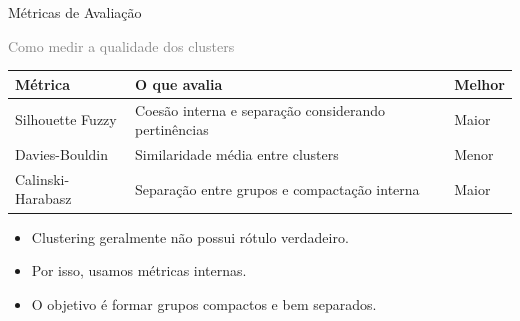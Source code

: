 \documentclass[aspectratio=43]{beamer}
\begin{document}
\begin{frame}[t]{Métricas de Avaliação}

\textcolor{gray}{\large Como medir a qualidade dos clusters}

\vspace{0.25cm}

\scriptsize
\renewcommand{\arraystretch}{1.22}
\begin{center}
\begin{tabular}{P{2.5cm} P{4.1cm} P{2.0cm}}
\toprule
\textbf{Métrica} & \textbf{O que avalia} & \textbf{Melhor} \\
\midrule
Silhouette Fuzzy & Coesão interna e separação considerando pertinências & Maior \\
Davies-Bouldin & Similaridade média entre clusters & Menor \\
Calinski-Harabasz & Separação entre grupos e compactação interna & Maior \\
\bottomrule
\end{tabular}
\end{center}

\vspace{0.35cm}

\begin{itemize}
    \item Clustering geralmente não possui rótulo verdadeiro.
    \item Por isso, usamos métricas internas.
    \item O objetivo é formar grupos compactos e bem separados.
\end{itemize}

\end{frame}
\end{document}
